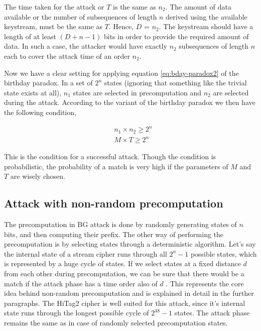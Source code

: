 The time taken for the attack or $T$ is the same as $n_2$. The amount of data available or the number of subsequences of length $n$ derived using the available keystream, must be the same as $T$. Hence, $D$ = $n_2$. The keystream should have a length of at least $(D + n - 1)$ bits in order to provide the required amount of data. In such a case, the attacker would have exactly $n_2$ subsequences of length $n$ each to cover the attack time of an order $n_2$.

Now we have a clear setting for applying equation \ref{eq:bday-paradox2} of the birthday paradox. In a set of $2^n$ states (ignoring that something like the trivial state exists at all), $n_1$ states are selected in precomputation and $n_2$ are selected during the attack. According to the variant of the birthday paradox we then have the following condition,

\begin{align*}
& n_1 \times n_2 \geq 2^n\\
& M \times T \geq 2^n
\end{align*}

This is the condition for a successful attack. Though the condition is probabilistic, the probability of a match is very high if the parameters of $M$ and $T$ are wisely chosen.

\subsection{Attack with non-random precomputation}
\label{sec:bg-nr}

The precomputation in BG attack is done by randomly generating states of $n$ bits, and then computing their prefix. The other way of performing the precomputation is by selecting states through a deterministic algorithm. Let's say the internal state of a stream cipher runs through all $2^n - 1$ possible states, which is represented by a huge cycle of states. If we select states at a fixed distance $d$ from each other during precomputation, we can be sure that there would be a match if the attack phase has a time order also of $d$ \cite{erik-discussions}. This represents the core idea behind non-random precomputation and is explained in detail in the further paragraphs. The HiTag2 cipher is well suited for this attack, since it's internal state runs through the longest possible cycle of $2^{48} - 1$ states. The attack phase remains the same as in case of randomly selected precomputation states.\\

